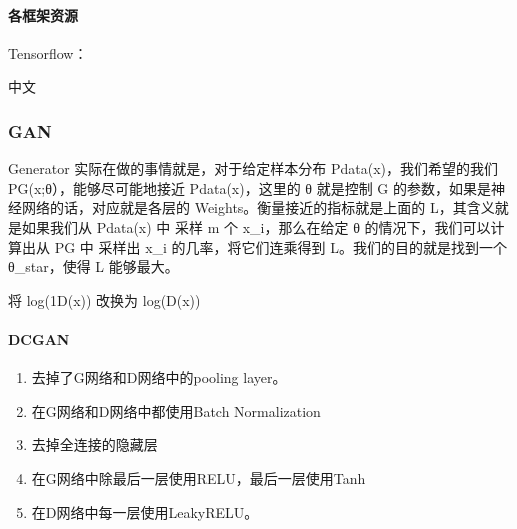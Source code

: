 \documentclass[letterpaper,10pt,english]{sphinxmanual}
\begin{document}
\paragraph{各框架资源}
\label{\detokenize{chapter_AI_dive/DL:id9}}
Tensorflow：

中文%
\begin{footnote}[949]\sphinxAtStartFootnote
{}
%
\end{footnote}


\subsubsection{GAN}
\label{\detokenize{chapter_AI_dive/GAN:gan}}\label{\detokenize{chapter_AI_dive/GAN::doc}}

Generator 实际在做的事情就是，对于给定样本分布 Pdata(x)，我们希望的我们
PG(x;θ），能够尽可能地接近 Pdata(x)，这里的 θ 就是控制 G
的参数，如果是神经网络的话，对应就是各层的
Weights。衡量接近的指标就是上面的 L，其含义就是如果我们从 Pdata(x) 中
采样 m 个 x\_i，那么在给定 θ 的情况下，我们可以计算出从 PG 中 采样出 x\_i
的几率，将它们连乘得到 L。我们的目的就是找到一个 θ\_star，使得 L
能够最大。

将 log(1\sphinxhyphen{}D(x)) 改换为 \sphinxhyphen{}log(D(x))


\paragraph{DCGAN}
\label{\detokenize{chapter_AI_dive/GAN:dcgan}}\begin{enumerate}
%
\item {} 
去掉了G网络和D网络中的pooling layer。

\item {} 
在G网络和D网络中都使用Batch Normalization

\item {} 
去掉全连接的隐藏层

\item {} 
在G网络中除最后一层使用RELU，最后一层使用Tanh

\item {} 
在D网络中每一层使用LeakyRELU。
%
\begin{footnote}[950]\sphinxAtStartFootnote
{}
%
\end{footnote}

\end{enumerate}
\end{document}
